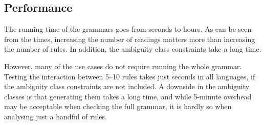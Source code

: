




\subsection{Performance} 
The running time of the grammars goes from seconds to hours. 
As can be seen from the times, increasing the number of readings
matters more than increasing the number of rules.
In addition, the ambiguity class constraints take a long time.


However, many of the use cases do not require running the whole
grammar. Testing the interaction between 5--10 rules takes just
seconds in all languages, if the ambiguity class constraints are not included. 
A downside in the ambiguity classes is that generating them takes a long time, 
and while 5-minute overhead may be acceptable when checking the full grammar,
it is hardly so when analysing just a handful of rules.




